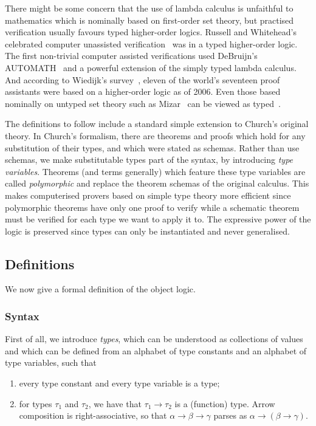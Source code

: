 There might be some concern that the use of lambda calculus is unfaithful to mathematics which is nominally based on first-order set theory, but practised verification usually favours typed higher-order logics. Russell and Whitehead's celebrated computer unassisted verification~\cite{Principia} was in a typed higher-order logic. The first non-trivial computer assisted verifications used DeBruijn's AUTOMATH~\cite{AUTOMATH} and a powerful extension of the simply typed lambda calculus. And according to Wiedijk's survey~\cite{SeventeenProvers}, eleven of the world's seventeen proof assistants were based on a higher-order logic as of 2006. Even those based nominally on untyped set theory such as Mizar~\cite{MizarMathematicalVernacular} can be viewed as typed~\cite{MizarSoftTypes}.

The definitions to follow include a standard simple extension to Church's original theory. In Church's formalism, there are theorems and proofs which hold for any substitution of their types, and which were stated as schemas. Rather than use schemas, we make substitutable types part of the syntax, by introducing \emph{type variables}. Theorems (and terms generally) which feature these type variables are called \emph{polymorphic} and replace the theorem schemas of the original calculus. This makes computerised provers based on simple type theory more efficient since polymorphic theorems have only one proof to verify while a schematic theorem must be verified for each type we want to apply it to. The expressive power of the logic is preserved since types can only be instantiated and never generalised.

\subsection{Definitions}\label{sec:ObjectLogicFormal}
We now give a formal definition of the object logic.

\subsubsection{Syntax}
First of all, we introduce \emph{types}, which can be understood as collections of values and which can be defined from an alphabet of type constants and an alphabet of type variables, such that
\begin{enumerate}
\item every type constant and every type variable is a type;
\item for types $\tau_1$ and $\tau_2$, we have that $\tau_1 \rightarrow \tau_2$ is a (function) type. Arrow composition is right-associative, so that $\alpha \rightarrow \beta \rightarrow \gamma$ parses as $\alpha \rightarrow (\beta \rightarrow \gamma)$.
\end{enumerate}

